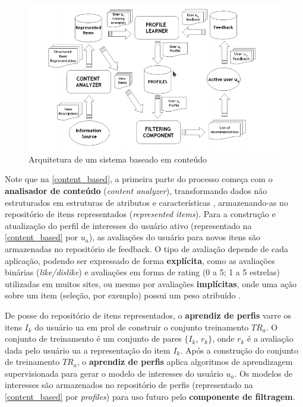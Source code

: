\begin{figure}[h!tp]
	\caption{\label{content_based}Arquitetura de um sistema baseado em conteúdo}
	\begin{center}
		\includegraphics[scale=0.75]{images/content_based.png}
	\end{center}
\end{figure}

Note que na \autoref{content_based}, a primeira parte do processo começa com o \textbf{analisador de conteúdo} (\textit{content analyzer}), transformando dados não estruturados em estruturas de atributos e características \cite{lops2011content, mladenic1999text}, armazenando-as no repositório de itens representados (\textit{represented items}). Para a construção e atualização do perfil de interesses do usuário ativo (representado na \autoref{content_based} por $u_{a}$), as avaliações do usuário para novos itens são armazenadas no repositório de feedback. O tipo de avaliação depende de cada aplicação, podendo ser expressado de forma \textbf{explícita}, como as avaliações binárias (\textit{like/dislike}) e avaliações em forma de rating (0 a 5; 1 a 5 estrelas) utilizadas em muitos sites, ou mesmo por avaliações \textbf{implícitas}, onde uma ação sobre um item (seleção, por exemplo) possui um peso atribuído \cite{pazzani2007content}.

De posse do repositório de itens representados, o \textbf{aprendiz de perfis} varre os itens $I_{k}$ do usuário ua em prol de construir o conjunto treinamento $TR_{a}$. O conjunto de treinamento é um conjunto de pares $\lbrace I_{k}$, $r_{k} \rbrace$, onde $r_{k}$ é a avaliação dada pelo usuário ua a representação do item $I_{k}$. Após a construção do conjunto de treinamento $TR_{a}$, o \textbf{aprendiz de perfis} aplica algoritmos de aprendizagem supervisionada para gerar o modelo de interesses do usuário $u_{a}$. Os modelos de interesses são armazenados no repositório de perfis (representado na \autoref{content_based} por \textit{profiles}) para uso futuro pelo \textbf{componente de filtragem}.

